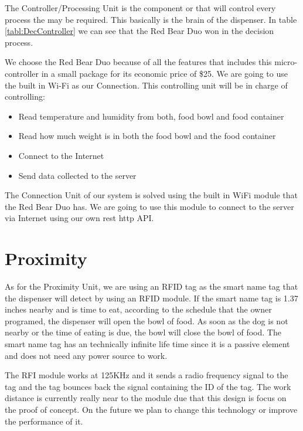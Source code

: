 \documentclass[12pt]{article}
\begin{document}
The Controller/Processing Unit is the component or that will control every process the may be required. This basically is the brain of the dispenser. In table \ref{tabl:DecController} we can see that the Red Bear Duo won in the decision process.

We choose the Red Bear Duo because of all the features that includes this micro-controller in a small package for its economic price of \$25. We are going to use the built in Wi-Fi  as our Connection. This controlling unit will be in charge of controlling:

\begin{itemize}
  \item Read temperature and humidity from both, food bowl and food container
  \item Read how much weight is in both the food bowl and the food container
  \item Connect to the Internet
  \item Send data collected to the server
\end{itemize}

The Connection Unit of our system is solved using the built in WiFi module that the Red Bear Duo has. We are going to use this module to connect to the server via Internet using our own rest http API.

\section{Proximity} %
\label{sec:proximity}

As for the Proximity Unit, we are using an RFID tag\cite{K2014} as the smart name tag that the dispenser will detect by using an RFID module. If the smart name tag is 1.37 inches nearby and is time to eat, according to the schedule that the owner programed, the dispenser will open the bowl of food. As soon as the dog is not nearby or the time of eating is due, the bowl will close the bowl of food. The smart name tag has an technically infinite life time since it is a passive element and does not need any power source to work.

The RFI module works at 125KHz and it sends a radio frequency signal to the tag and the tag bounces back the signal containing the ID of the tag. The work distance is currently really near to the module due that this design is focus on the proof of concept. On the future we plan to change this technology or improve the performance of it.
\end{document}
